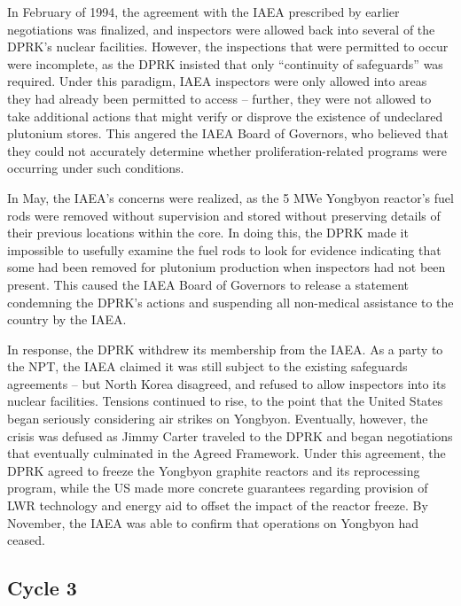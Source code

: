 \documentclass{article}
\begin{document}
In February of 1994, the agreement with the IAEA prescribed by earlier negotiations was finalized, and inspectors were allowed back into several of the DPRK’s nuclear facilities\cite{davenport}. However, the inspections that were permitted to occur were incomplete, as the DPRK insisted that only “continuity of safeguards” was required\cite{iaea09}. Under this paradigm, IAEA inspectors were only allowed into areas they had already been permitted to access – further, they were not allowed to take additional actions that might verify or disprove the existence of undeclared plutonium stores. This angered the IAEA Board of Governors, who believed that they could not accurately determine whether proliferation-related programs were occurring under such conditions\cite{davenport}.

In May, the IAEA’s concerns were realized, as the 5 MWe Yongbyon reactor’s fuel rods were removed without supervision and stored without preserving details of their previous locations within the core. In doing this, the DPRK made it impossible to usefully examine the fuel rods to look for evidence indicating that some had been removed for plutonium production when inspectors had not been present\cite{nobacksies}. This caused the IAEA Board of Governors to release a statement condemning the DPRK’s actions and suspending all non-medical assistance to the country by the IAEA\cite{iaea94}.

In response, the DPRK withdrew its membership from the IAEA. As a party to the NPT, the IAEA claimed it was still subject to the existing safeguards agreements – but North Korea disagreed, and refused to allow inspectors into its nuclear facilities\cite{iaea09}. Tensions continued to rise, to the point that the United States began seriously considering air strikes on Yongbyon\cite{jun}. Eventually, however, the crisis was defused as Jimmy Carter traveled to the DPRK and began negotiations that eventually culminated in the Agreed Framework\cite{nti15}. Under this agreement, the DPRK agreed to freeze the Yongbyon graphite reactors and its reprocessing program, while the US made more concrete guarantees regarding provision of LWR technology and energy aid to offset the impact of the reactor freeze\cite{agreed}. By November, the IAEA was able to confirm that operations on Yongbyon had ceased\cite{davenport}.

\subsection{Cycle 3}
\end{document}
